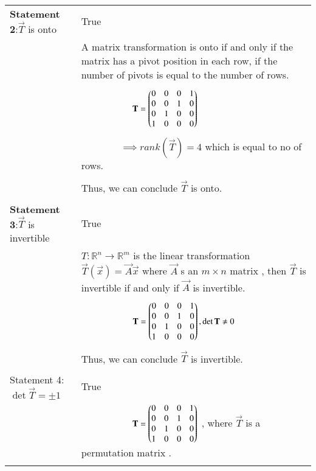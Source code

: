 \documentclass[journal,12pt]{IEEEtran}
\begin{document}
\begin{longtable}{|p{5cm}|p{13cm}|}
	\hline
	\multirow{3}{*}{\textbf{Statement 2}:$\vec{T}$ is onto}&\\
    & True\\
	\hline
	&\\
	& A matrix transformation is onto if and only if the matrix has a pivot position in each row, if the number of pivots is equal to the number of rows.\\
	&\\
	& $\qquad\qquad\qquad\mathbf{T}=\begin{pmatrix}0&0&0&1\\0&0&1&0\\0&1&0&0\\1&0&0&0\end{pmatrix}$\\
	&\\
	& $\qquad\qquad\implies rank(\vec{T})= 4$ which is equal to no of rows.\\
	&\\
	& Thus, we can conclude $\vec{T}$ is onto.\\
	&\\
	
	\hline
	\multirow{3}{*}{\textbf{Statement 3}:$\vec{T}$ is invertible} &\\
    & True\\
	\hline
	&\\
	& $T:\mathbb{R}^{n}\rightarrow \mathbb{R}^{m}$ is the linear transformation $\vec{T}(\vec{x})=\vec{A}\vec{x}$ where $\vec{A}$ s an $m\times n$ matrix , then $\vec{T}$ is invertible if and only if $\vec{A}$ is invertible.\\
	&\\
	& $\qquad\qquad\qquad\mathbf{T}=\begin{pmatrix}0&0&0&1\\0&0&1&0\\0&1&0&0\\1&0&0&0\end{pmatrix} , \det{\mathbf{T}}\neq 0$\\
	&\\
	& Thus, we can conclude $\vec{T}$ is invertible.\\
	&\\
	\hline
	\multirow{3}{*}{Statement 4: $\det{\vec{T}}=\pm1$}&\\
	& True\\
	\hline
	&\\
		& $\qquad\qquad\qquad\mathbf{T}=\begin{pmatrix}0&0&0&1\\0&0&1&0\\0&1&0&0\\1&0&0&0\end{pmatrix}$ , where $\vec{T}$ is a permutation matrix .\\
	&\\
	

\end{longtable}
\end{document}
